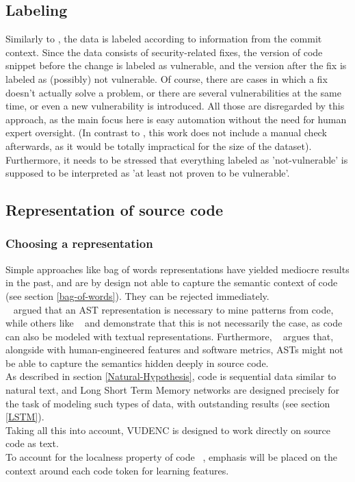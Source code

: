 \documentclass[
a4paper,
pagesize,
pdftex,
12pt,
twoside, %
BCOR=5mm, %
ngerman,
fleqn,
final,
]{scrartcl}
\begin{document}
	
	\subsection{Labeling}
	Similarly to \cite{Li.2018}, the data is labeled according to information from the commit context. Since the data consists of security-related fixes, the version of code snippet before the change is labeled as vulnerable, and the version after the fix is labeled as (possibly) not vulnerable. Of course, there are cases in which a fix doesn't actually solve a problem, or there are several vulnerabilities at the same time, or even a new vulnerability is introduced. All those are disregarded by this approach, as the main focus here is easy automation without the need for human expert oversight. (In contrast to \cite{Li.2018}, this work does not include a manual check afterwards, as it would be totally impractical for the size of the dataset). Furthermore, it needs to be stressed that everything labeled as 'not-vulnerable' is supposed to be interpreted as 'at least not proven to be vulnerable'.
	
	\subsection{Representation of source code}
	
	\subsubsection{Choosing a representation}
	Simple approaches like bag of words representations have yielded mediocre results in the past, and are by design not able to capture the semantic context of code (see section \ref{bag-of-words}). They can be rejected immediately.\\
	~\cite{Liu.2018} argued that an AST representation is necessary to mine patterns from code, while others like ~\cite{Russell.2018} and \cite{Hovsepyan.2012} demonstrate that this is not necessarily the case, as code can also be modeled with textual representations. Furthermore, ~\cite{Dam.2016} argues that, alongside with human-engineered features and software metrics, ASTs might not be able to capture the semantics hidden deeply in source code.\\
	As described in section \ref{Natural-Hypothesis}, code is sequential data similar to natural text, and Long Short Term Memory networks are designed precisely for the task of modeling such types of data, with outstanding results (see section \ref{LSTM}).\\
	Taking all this into account, VUDENC is designed to work directly on source code as text.\\
	To account for the localness property of code ~\cite{Tu.2014}, emphasis will be placed on the context around each code token for learning features.
	
\end{document}
